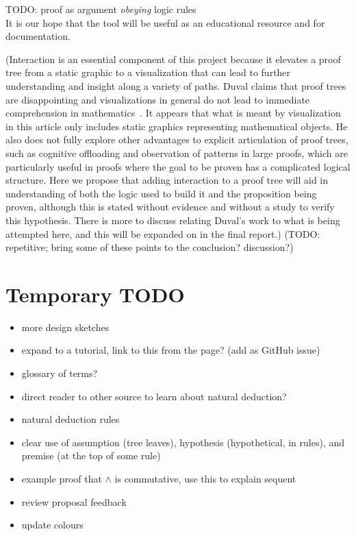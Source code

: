 \documentclass[conference]{IEEEtran}
\begin{document}

TODO: proof as argument \textit{obeying} logic rules \\

It is our hope that the tool will be useful as an educational resource and for documentation.

(Interaction is an essential component of this project because it elevates a proof tree from a static graphic to a visualization that can lead to further understanding and insight along a variety of paths. Duval claims that proof trees are disappointing and visualizations in general do not lead to immediate comprehension in mathematics~\cite{repvisvis-duval}. It appears that what is meant by visualization in this article only includes static graphics representing mathematical objects. He also does not fully explore other advantages to explicit articulation of proof trees, such as cognitive offloading and observation of patterns in large proofs, which are particularly useful in proofs where the goal to be proven has a complicated logical structure. Here we propose that adding interaction to a proof tree will aid in understanding of both the logic used to build it and the proposition being proven, although this is stated without evidence and without a study to verify this hypothesis. There is more to discuss relating Duval’s work to what is being attempted here, and this will be expanded on in the final report.) (TODO: repetitive; bring some of these points to the conclusion? discussion?)


\section{Temporary TODO}

\begin{itemize}
\item more design sketches
\item expand to a tutorial, link to this from the page? (add as GitHub issue)
\item glossary of terms?
\item direct reader to other source to learn about natural deduction?
\item natural deduction rules
\item clear use of assumption (tree leaves), hypothesis (hypothetical, in rules), and premise (at the top of some rule)
\item example proof that $\wedge$ is commutative, use this to explain sequent
\item review proposal feedback
\item update colours
\end{itemize}
\end{document}
